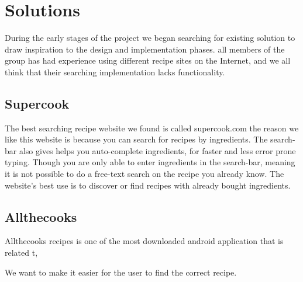 \section{Solutions}
During the early stages of the project we began searching for existing solution to draw inspiration to the design and implementation phases. all members of the group has had experience using different recipe sites on the Internet, and we all think that their searching implementation lacks functionality.

\subsection*{Supercook}
The best searching recipe website we found is called supercook.com\cite{supercook} the reason we like this website is because you can search for recipes by ingredients. The search-bar also gives helps you auto-complete ingredients, for faster and less error prone typing. Though you are only able to enter ingredients in the search-bar, meaning it is not possible to do a free-text search on the recipe you already know. The website's best use is to discover or find recipes with already bought ingredients.

\subsection*{Allthecooks}
Allthecooks recipes is one of the most downloaded android application that is related t,


We want to make it easier for the user to find the correct recipe.



